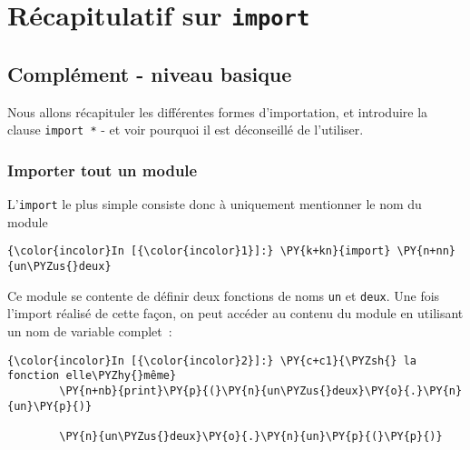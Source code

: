     
    
    
    

    

    \hypertarget{ruxe9capitulatif-sur-import}{%
\section{\texorpdfstring{Récapitulatif sur
\texttt{import}}{Récapitulatif sur import}}\label{ruxe9capitulatif-sur-import}}

    \hypertarget{compluxe9ment---niveau-basique}{%
\subsection{Complément - niveau
basique}\label{compluxe9ment---niveau-basique}}

    Nous allons récapituler les différentes formes d'importation, et
introduire la clause \texttt{import\ *} - et voir pourquoi il est
déconseillé de l'utiliser.

    \hypertarget{importer-tout-un-module}{%
\subsubsection{Importer tout un module}\label{importer-tout-un-module}}

    L'\texttt{import} le plus simple consiste donc à uniquement mentionner
le nom du module

    \begin{Verbatim}[commandchars=\\\{\},frame=single,framerule=0.3mm,rulecolor=\color{cellframecolor}]
{\color{incolor}In [{\color{incolor}1}]:} \PY{k+kn}{import} \PY{n+nn}{un\PYZus{}deux}
\end{Verbatim}


    Ce module se contente de définir deux fonctions de noms \texttt{un} et
\texttt{deux}. Une fois l'import réalisé de cette façon, on peut accéder
au contenu du module en utilisant un nom de variable complet~:

    \begin{Verbatim}[commandchars=\\\{\},frame=single,framerule=0.3mm,rulecolor=\color{cellframecolor}]
{\color{incolor}In [{\color{incolor}2}]:} \PY{c+c1}{\PYZsh{} la fonction elle\PYZhy{}même}
        \PY{n+nb}{print}\PY{p}{(}\PY{n}{un\PYZus{}deux}\PY{o}{.}\PY{n}{un}\PY{p}{)}
        
        \PY{n}{un\PYZus{}deux}\PY{o}{.}\PY{n}{un}\PY{p}{(}\PY{p}{)}
\end{Verbatim}


